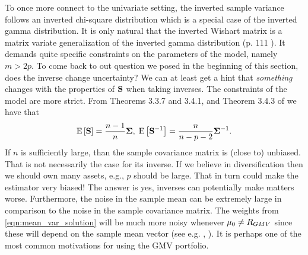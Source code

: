 \documentclass[oneside]{book}\usepackage{knitr}
\begin{document}
To once more connect to the univariate setting, the inverted sample variance follows an inverted chi-square distribution which is a special case of the inverted gamma distribution.
It is only natural that the inverted Wishart matrix is a matrix variate generalization of the inverted gamma distribution (p. 111 \citet{GuptaNagar2000}). 
It demands quite specific constraints on the parameters of the model, namely $m > 2p$.
To come back to out question we posed in the beginning of this section, does the inverse change uncertainty? 
We can at least get a hint that \textit{something} changes with the properties of $\mathbf{S}$ when taking inverses.
The constraints of the model are more strict.
From Theorems 3.3.7 and 3.4.1, and Theorem 3.4.3 of \citet{GuptaNagar2000} we have that
$$
\operatorname{E}\left[\mathbf{S}\right] = \frac{n-1}{n} \mathbf{\Sigma}, \; 
\operatorname{E}\left[\mathbf{S}^{-1}\right] = \frac{n}{n-p-2}\mathbf{\Sigma}^{-1}.
$$
If $n$ is sufficiently large, than the sample covariance matrix is (close to) unbiased.
That is not necessarily the case for its inverse.
If we believe in diversification then we should own many assets, e.g., $p$ should be large. 
That in turn could make the estimator very biased!
The answer is yes, inverses can potentially make matters worse.
Furthermore, the noise in the sample mean can be extremely large in comparison to the noise in the sample covariance matrix.
The weights from \eqref{eqn:mean_var_solution} will be much more noisy whenever $\mu_0 \neq R_{GMV}$ since these will depend on the sample mean vector (see e.g. \citet{merton1980estimating}, \citet{chopra1993effect}).
It is perhaps one of the most common motivations for using the GMV portfolio.
\end{document}
